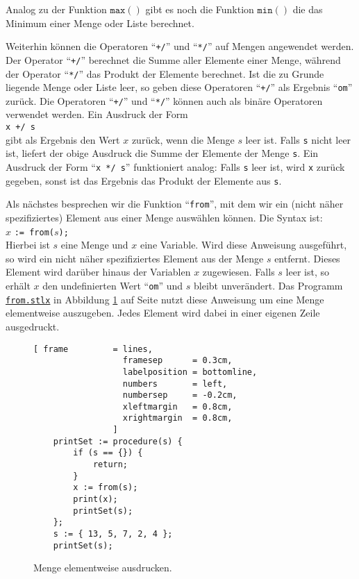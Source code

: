Analog zu der Funktion $\mathtt{max}()$ gibt es noch die Funktion $\texttt{min}()$ die das
Minimum einer Menge oder Liste berechnet.  

Weiterhin k\"{o}nnen die Operatoren ``\texttt{+/}''
und ``\texttt{*/}'' auf Mengen angewendet werden.  Der Operator  ``\texttt{+/}'' berechnet
die Summe aller Elemente einer Menge, w\"{a}hrend der Operator ``\texttt{*/}'' das Produkt der
Elemente berechnet.  Ist die zu Grunde liegende Menge oder Liste leer, so geben diese
Operatoren ``\texttt{+/}'' als Ergebnis ``\texttt{om}'' zur\"{u}ck.
Die Operatoren ``\texttt{+/}'' und ``\texttt{*/}'' k\"{o}nnen auch als bin\"{a}re Operatoren
verwendet werden.  Ein Ausdruck der Form
\\[0.2cm]
\hspace*{1.3cm}
\texttt{x +/ s}
\\[0.2cm]
gibt als Ergebnis den Wert $x$ zur\"{u}ck, wenn die Menge $s$ leer ist.  Falls \texttt{s}
nicht leer ist, liefert der obige Ausdruck die Summe der Elemente der Menge \texttt{s}.
Ein Ausdruck der Form ``\texttt{x */ s}'' funktioniert analog:  Falls \texttt{s} leer ist,
wird \texttt{x} zur\"{u}ck gegeben, sonst ist das Ergebnis das Produkt der Elemente aus \texttt{s}.

Als n\"{a}chstes besprechen wir die Funktion
``\texttt{from}'', mit dem wir ein (nicht n\"{a}her spezifiziertes) Element aus einer
Menge ausw\"{a}hlen k\"{o}nnen.  Die Syntax ist: 
\\[0.2cm]
\hspace*{1.3cm} 
$x$ \texttt{:= from(}$s$\texttt{);}
\\[0.2cm]
Hierbei ist $s$ eine Menge und $x$  eine Variable.  Wird diese Anweisung
ausgef\"{u}hrt, so wird ein nicht n\"{a}her spezifiziertes Element aus der Menge $s$
entfernt.  Dieses Element wird dar\"{u}ber hinaus der Variablen $x$ zugewiesen.
Falls $s$ leer ist, so erh\"{a}lt $x$ den undefinierten Wert ``\texttt{om}'' und
$s$ bleibt unver\"{a}ndert.  Das Programm 
\href{https://github.com/karlstroetmann/Logik/blob/master/SetlX/from.stlx}{\texttt{from.stlx}}
in Abbildung \ref{fig:from.stlx} auf Seite
\pageref{fig:from.stlx} nutzt diese Anweisung um eine Menge elementweise
auszugeben.  Jedes Element wird dabei in einer eigenen Zeile ausgedruckt.

\begin{figure}[!ht]
  \centering
\begin{Verbatim}[ frame         = lines, 
                  framesep      = 0.3cm, 
                  labelposition = bottomline,
                  numbers       = left,
                  numbersep     = -0.2cm,
                  xleftmargin   = 0.8cm,
                  xrightmargin  = 0.8cm,
                ]
    printSet := procedure(s) {
        if (s == {}) {
            return;
        }
        x := from(s);
        print(x);
        printSet(s);
    };
    s := { 13, 5, 7, 2, 4 };
    printSet(s);
\end{Verbatim} 
\vspace*{-0.3cm}
\caption{Menge elementweise ausdrucken.}  \label{fig:from.stlx}
\end{figure} 

